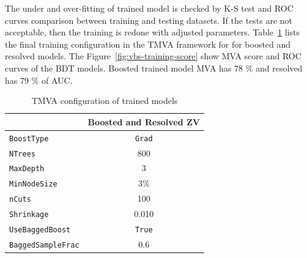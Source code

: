 The under and over-fitting of trained model is checked by \gls{K-S} test
and \gls{ROC} curves comparison between training and testing datasets.
If the tests are not acceptable, then the training is redone with adjusted parameters.
Table~\ref{tab:training-tmva-config} lists the final
training configuration in the \gls{TMVA} framework for
for boosted and resolved models.
The Figure~\ref{fig:vbs-training-score} show \gls{MVA} score and \gls{ROC} curves
of the BDT models. Boosted trained model \gls{MVA} has 78 \% and resolved
has 79 \% of \gls{AUC}.

\begin{table}[!ht]
  \centering
  \caption{TMVA configuration of trained models}
  \begin{tabular}{lc}%
    \toprule
                            & Boosted and Resolved ZV \\
    \midrule\relax
    \verb|BoostType|        & \verb|Grad|             \\
    \verb|NTrees|           & 800                     \\
    \verb|MaxDepth|         & 3                       \\
    \verb|MinNodeSize|      & 3\%                     \\
    \verb|nCuts|            & 100                     \\
    \verb|Shrinkage|        & 0.010                   \\
    \verb|UseBaggedBoost|   & \verb|True|             \\
    \verb|BaggedSampleFrac| & 0.6                     \\
    \bottomrule
  \end{tabular}\label{tab:training-tmva-config}
\end{table}

